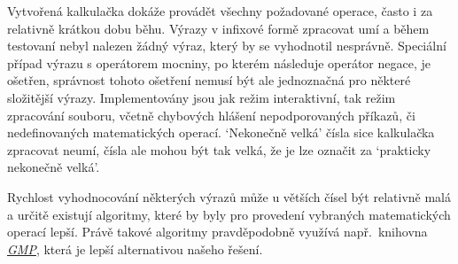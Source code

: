 Vytvořená kalkulačka dokáže provádět všechny požadované operace, často i za relativně krátkou dobu běhu. Výrazy v infixové formě zpracovat umí a během testovaní nebyl nalezen žádný výraz, který by se vyhodnotil nesprávně. Speciální případ výrazu s operátorem mocniny, po kterém následuje operátor negace, je ošetřen, správnost tohoto ošetření nemusí být ale jednoznačná pro některé složitější výrazy. Implementovány jsou jak režim interaktivní, tak režim zpracování souboru, včetně chybových hlášení nepodporovaných příkazů, či nedefinovaných matematických operací. `Nekonečně velká' čísla sice kalkulačka zpracovat neumí, čísla ale mohou být tak velká, že je lze označit za `prakticky nekonečně velká'.

Rychlost vyhodnocování některých výrazů může u větších čísel být relativně malá a určitě existují algoritmy, které by byly pro provedení vybraných matematických operací lepší. Právě takové algoritmy pravděpodobně využívá např.~knihovna \href{https://gmplib.org/}{\textit{GMP}}, která je lepší alternativou našeho řešení.